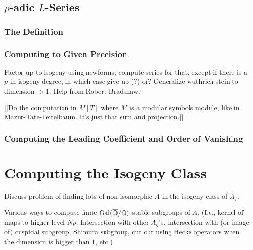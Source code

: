 \documentclass{article}
\begin{document}
\subsection{$p$-adic $L$-Series}


\subsubsection{The Definition}

\subsubsection{Computing to Given Precision}
Factor up to isogeny using newforms; compute series for that,
except if there is a $p$ in isogeny degree, in which case give up (?) or?
Generalize wuthrich-stein to dimension $>1$.  Help from Robert Bradshaw.

	[[Do the computation in $M[T]$ where $M$ is a modular symbols module, like
				in Mazur-Tate-Teitelbaum.  It's just that sum and projection.]]

\subsubsection{Computing the Leading Coefficient and Order of Vanishing}


\section{Computing the Isogeny Class}

Discuss problem of finding lots of non-isomorphic $A$ in the isogeny
class of $A_f$.

Various ways to compute finite $\operatorname{Gal}(\overline{\mathbb{Q}}/\mathbb{Q})$-stable subgroups of
$A$.  (I.e., kernel of maps to higher level $Np$.  Intersection with
other $A_g$'s.  Intersection with (or image of) cuspidal subgroup,
Shimura subgroup, cut out using Hecke operators when the dimension is
bigger than $1$, etc.)
\end{document}
